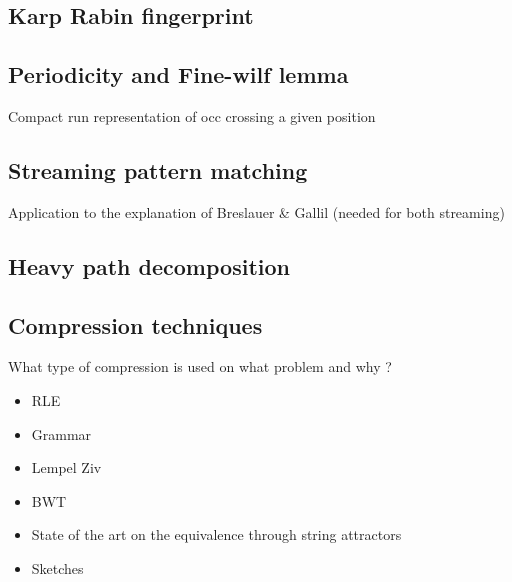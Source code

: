 

\subsection{Karp Rabin fingerprint} 
\subsection{Periodicity and Fine-wilf lemma}
Compact run representation of occ crossing a given position

\subsection{Streaming pattern matching}
Application to the explanation of Breslauer \& Gallil (needed for both streaming)

\subsection{Heavy path decomposition}


\subsection{Compression techniques}
What type of compression is used on what problem and why ?
\begin{itemize}
\item RLE
\item Grammar
\item Lempel Ziv
\item BWT
\item State of the art on the equivalence through string attractors
\item Sketches
\end{itemize}